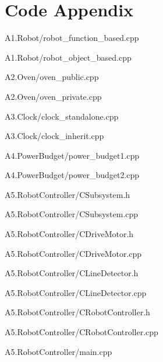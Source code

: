 \documentclass[10pt,a4paper]{article}
\begin{document}
\clearpage
\section{Code Appendix}


{A1.Robot/robot_function_based.cpp}

\newpage

{A1.Robot/robot_object_based.cpp}
\newpage

{A2.Oven/oven_public.cpp}
\newpage

{A2.Oven/oven_private.cpp}
\newpage

{A3.Clock/clock_standalone.cpp}
\newpage

{A3.Clock/clock_inherit.cpp}
\newpage

{A4.PowerBudget/power_budget1.cpp}
\newpage

{A4.PowerBudget/power_budget2.cpp}
\newpage

{A5.RobotController/CSubsystem.h}
\newpage

{A5.RobotController/CSubsystem.cpp}
\newpage

{A5.RobotController/CDriveMotor.h}
\newpage

{A5.RobotController/CDriveMotor.cpp}
\newpage

{A5.RobotController/CLineDetector.h}
\newpage

{A5.RobotController/CLineDetector.cpp}
\newpage

{A5.RobotController/CRobotController.h}
\newpage

{A5.RobotController/CRobotController.cpp}
\newpage

{A5.RobotController/main.cpp}
\end{document}
